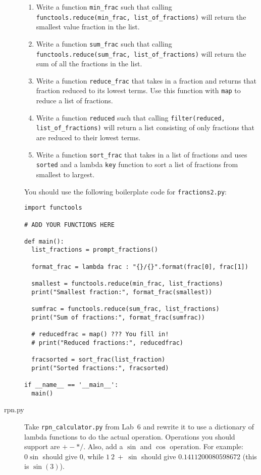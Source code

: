 \documentclass[11pt]{cselabheader}
\begin{document}
\begin{description}
\begin{enumerate}
      \item Write a function \lstinline{min_frac} such that calling
        \lstinline{functools.reduce(min_frac, list_of_fractions)} will return
        the smallest value fraction in the list.
      \item Write a function \lstinline{sum_frac} such that calling
        \lstinline{functools.reduce(sum_frac, list_of_fractions)} will return
        the sum of all the fractions in the list.
      \item Write a function \lstinline{reduce_frac} that takes in a fraction
        and returns that fraction reduced to its lowest terms. Use this function
        with \lstinline{map} to reduce a list of fractions.
      \item Write a function \lstinline{reduced} such that calling
        \lstinline{filter(reduced, list_of_fractions)} will return a list consisting
        of only fractions that are reduced to their lowest terms.
      \item Write a function \lstinline!sort_frac! that takes in a list of
        fractions and uses \lstinline{sorted}
        and a lambda \lstinline{key} function to sort a list of fractions from
        smallest to largest.
    \end{enumerate}

    You should use the following boilerplate code for \texttt{fractions2.py}:
    \begin{lstlisting}
import functools

# ADD YOUR FUNCTIONS HERE

def main():
  list_fractions = prompt_fractions()

  format_frac = lambda frac : "{}/{}".format(frac[0], frac[1])

  smallest = functools.reduce(min_frac, list_fractions)
  print("Smallest fraction:", format_frac(smallest))

  sumfrac = functools.reduce(sum_frac, list_fractions)
  print("Sum of fractions:", format_frac(sumfrac))

  # reducedfrac = map() ??? You fill in!
  # print("Reduced fractions:", reducedfrac)

  fracsorted = sort_frac(list_fraction)
  print("Sorted fractions:", fracsorted)

if __name__ == '__main__':
  main()
    \end{lstlisting}

  \item[rpn.py] Take \texttt{rpn\_calculator.py} from Lab~6 and rewrite
    it to use a dictionary of lambda functions to do the actual operation.
    Operations you should support are $+ - * /$. Also, add a $\sin$ and $\cos$
    operation. For example: $0 \sin$ should give $0$, while $1~2~+~\sin$ should
    give $0.1411200080598672$ (this is $\sin(3)$).


\end{description}
\end{document}
